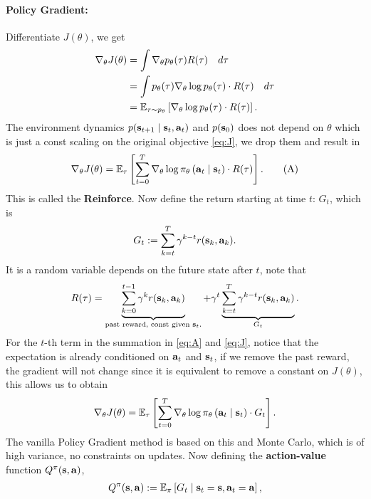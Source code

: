 \documentclass[11pt]{article}  %
\begin{document}
\paragraph{Policy Gradient:}
Differentiate $J(\theta)$, we get 
\begin{align*}
  \nabla_{\theta} J(\theta) &= \int \nabla_\theta p_\theta(\tau) R(\tau) \quad d\tau \\
  &= \int p_\theta(\tau) \nabla_{\theta} \log p_{\theta}(\tau) \cdot R(\tau) \quad d\tau \\
  &= \mathbb{E}_{\tau \sim p_\theta}\left[\nabla_\theta\log p_{\theta}(\tau)\cdot R(\tau)\right].
\end{align*}
The environment dynamics $p(\mathbf{s}_{t+1}\mid \mathbf{s}_t, \mathbf{a}_t)$ and $p(\mathbf{s}_0)$ does not depend on $\theta$ which is just a const scaling on the original objective \eqref{eq:J}, we drop them and result in
\begin{align}
  \label{eq:A}
  \nabla_{\theta} J(\theta) = \mathbb{E}_{\tau}\left[\sum_{t=0}^{T}\nabla_\theta \log \pi_{\theta}\left( \mathbf{a}_t \mid \mathbf{s}_t \right) \cdot R(\tau)\right]. \tag{A}
\end{align}
This is called the \textbf{Reinforce}.
Now define the return starting at time $t$: $G_t$, which is 
\begin{align*}
  G_t := \sum_{k=t}^{T}\gamma^{k - t}r(\mathbf{s}_k, \mathbf{a}_k).
\end{align*}
It is a random variable depends on the future state after $t$, note that 
\begin{align*}
  R(\tau) = \underbrace{\sum_{k=0}^{t-1}\gamma^k r(\mathbf{s}_k, \mathbf{a}_k)}_{\text{past reward, const given $\mathbf{s}_t$.}} + \gamma^t\underbrace{\sum_{k=t}^{T}\gamma^{k-t}r(\mathbf{s}_k, \mathbf{a}_k)}_{G_t}.
\end{align*}
For the $t$-th term in the summation in \eqref{eq:A} and \eqref{eq:J}, notice that the expectation is already conditioned on $\mathbf{a}_t$ and $\mathbf{s}_t$, if we remove the past reward, the gradient will not change since it is equivalent to remove a constant on $J(\theta)$, this allows us to obtain 
\begin{align}
  \label{eq:JG}
  \nabla_{\theta} J(\theta) = \mathbb{E}_{\tau}\left[\sum_{t=0}^{T}\nabla_\theta \log \pi_{\theta}\left( \mathbf{a}_t \mid \mathbf{s}_t \right) \cdot G_t\right].
\end{align}
The vanilla Policy Gradient method is based on this and Monte Carlo, which is of high variance, no constraints on updates.
Now defining the \textbf{action-value} function $Q^{\pi}(\mathbf{s}, \mathbf{a})$,
\begin{align*}
  Q^{\pi}(\mathbf{s}, \mathbf{a}) := \mathbb{E}_{\pi}\left[G_t \mid \mathbf{s}_t = \mathbf{s}, \mathbf{a}_t = \mathbf{a}\right],
\end{align*}
\end{document}

